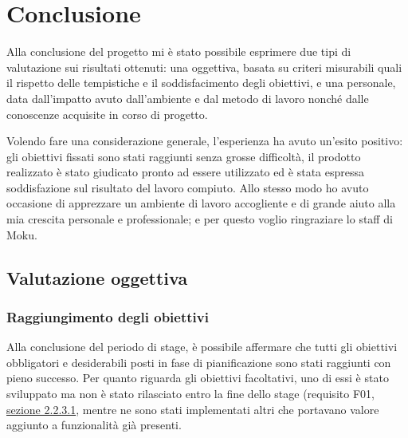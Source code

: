 \chapter{Conclusione}
\label{conclusion}
Alla conclusione del progetto mi è stato possibile esprimere due tipi di valutazione sui risultati ottenuti: una oggettiva, basata su criteri misurabili quali il rispetto delle tempistiche e il soddisfacimento degli obiettivi, e una personale, data dall'impatto avuto dall'ambiente e dal metodo di lavoro nonché dalle conoscenze acquisite in corso di progetto. 

Volendo fare una considerazione generale, l'esperienza ha avuto un'esito positivo: gli obiettivi fissati sono stati raggiunti senza grosse difficoltà, il prodotto realizzato è stato giudicato pronto ad essere utilizzato ed è stata espressa soddisfazione sul risultato del lavoro compiuto. Allo stesso modo ho avuto occasione di apprezzare un ambiente di lavoro accogliente e di grande aiuto alla mia crescita personale e professionale; e per questo voglio ringraziare lo staff di Moku.
\section{Valutazione oggettiva}
\subsection{Raggiungimento degli obiettivi}
Alla conclusione del periodo di stage, è possibile affermare che tutti gli obiettivi obbligatori e desiderabili posti in fase di pianificazione sono stati raggiunti con pieno successo. Per quanto riguarda gli obiettivi facoltativi, uno di essi è stato sviluppato ma non è stato rilasciato entro la fine dello stage (requisito F01, \hyperref[sec:2.2.3]{sezione 2.2.3.1}, mentre ne sono stati implementati altri che portavano valore aggiunto a funzionalità già presenti.

